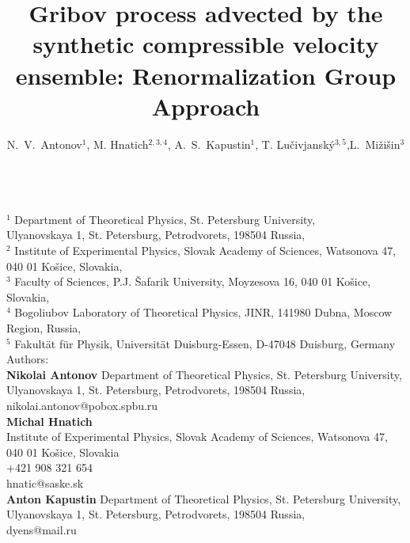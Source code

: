 \documentclass[12pt]{article}
\begin{document}
\title{Gribov process advected by the synthetic compressible velocity
ensemble: Renormalization Group Approach}


\author{N.~V.~Antonov$^{1}$, M. Hnatich$^{2,3,4}$, A.~S.~Kapustin$^{1}$, T. Lu\v{c}ivjansk\'y$^{3,5}$,L.~Mi\v{z}i\v{s}in$^{3}$}

\maketitle \mbox{ }\\
 $^{1}$ Department of Theoretical Physics, St. Petersburg 
University,\\Ulyanovskaya 1, St. Petersburg, Petrodvorets, 198504 Russia,\\
 $^{2}$ Institute of Experimental
Physics, Slovak Academy of Sciences, Watsonova 47, 040 01
Ko\v{s}ice, Slovakia,\\
$^{3}$ Faculty of Sciences, P.J. \v{S}afarik
University, Moyzesova 16, 040 01 Ko\v{s}ice, Slovakia,\\
$^4$ Bogoliubov Laboratory of Theoretical Physics, JINR, 141980 Dubna, Moscow Region, Russia,\\
$^{5}$ Fakult\"at f\"ur Physik, Universit\"at Duisburg-Essen, D-47048 Duisburg, Germany\\

Authors:\\
{\bf Nikolai Antonov}
Department of Theoretical Physics, St. Petersburg 
University,\\Ulyanovskaya 1, St. Petersburg, Petrodvorets, 198504 Russia,\\
nikolai.antonov@pobox.spbu.ru\\

{\bf Michal Hnatich}\\
 Institute of Experimental
Physics, Slovak Academy of Sciences, Watsonova 47, 040 01
Ko\v{s}ice, Slovakia \\
+421 908 321 654\\
 hnatic@saske.sk\\

 {\bf Anton Kapustin}
 Department of Theoretical Physics, St. Petersburg 
University,\\Ulyanovskaya 1, St. Petersburg, Petrodvorets, 198504 Russia,\\
dyens@mail.ru\\
\end{document}
